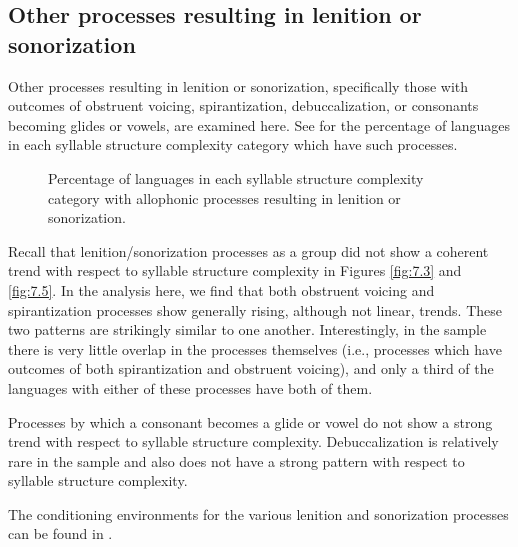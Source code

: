\subsection{Other processes resulting in lenition or sonorization}\label{sec:7.3.6}

  Other processes resulting in lenition or sonorization, specifically those with outcomes of obstruent voicing, spirantization, debuccalization, or consonants becoming glides or vowels, are examined here. See  for the percentage of languages in each syllable structure complexity category which have such processes.

\begin{figure}
\caption{\label{fig:7.10} Percentage of languages in each syllable structure complexity category with allophonic processes resulting in lenition or sonorization.}
\end{figure}
  Recall that lenition/sonorization processes as a group did not show a coherent trend with respect to syllable structure complexity in Figures \ref{fig:7.3} and \ref{fig:7.5}. In the analysis here, we find that both obstruent voicing and spirantization processes show generally rising, although not linear, trends. These two patterns are strikingly similar to one another. Interestingly, in the sample there is very little overlap in the processes themselves (i.e., processes which have outcomes of both spirantization and obstruent voicing), and only a third of the languages with either of these processes have both of them.

  Processes by which a consonant becomes a glide or vowel do not show a strong trend with respect to syllable structure complexity. Debuccalization is relatively rare in the sample and also does not have a strong pattern with respect to syllable structure complexity.

  The conditioning environments for the various lenition and sonorization processes can be found in .

